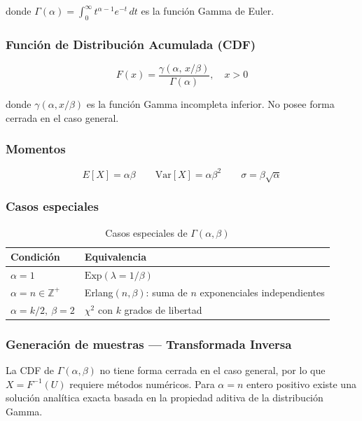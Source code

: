 donde $\Gamma(\alpha) = \int_0^{\infty} t^{\alpha-1} e^{-t}\, dt$ es la función Gamma de Euler.

\subsubsection{Función de Distribución Acumulada (CDF)}

\begin{equation}
F(x) = \frac{\gamma(\alpha,\, x/\beta)}{\Gamma(\alpha)}, \quad x > 0
\end{equation}

donde $\gamma(\alpha, x/\beta)$ es la función Gamma incompleta inferior. No posee forma
cerrada en el caso general.

\subsubsection{Momentos}

\begin{equation}
E[X] = \alpha\beta \qquad
\text{Var}[X] = \alpha\beta^2 \qquad
\sigma = \beta\sqrt{\alpha}
\end{equation}

\subsubsection{Casos especiales}

\begin{table}[h!]
\centering
\begin{tabular}{|l|l|}
\hline
\textbf{Condición} & \textbf{Equivalencia} \\
\hline
$\alpha = 1$ & $\text{Exp}(\lambda = 1/\beta)$ \\
$\alpha = n \in \mathbb{Z}^+$ & Erlang$(n, \beta)$: suma de $n$ exponenciales independientes \\
$\alpha = k/2,\ \beta = 2$ & $\chi^2$ con $k$ grados de libertad \\
\hline
\end{tabular}
\caption{Casos especiales de $\Gamma(\alpha, \beta)$}
\end{table}

\subsubsection{Generación de muestras — Transformada Inversa}

La CDF de $\Gamma(\alpha, \beta)$ no tiene forma cerrada en el caso general, por lo que
$X = F^{-1}(U)$ requiere métodos numéricos. Para $\alpha = n$ entero positivo existe
una solución analítica exacta basada en la propiedad aditiva de la distribución Gamma.


